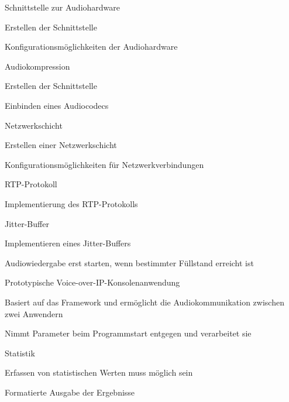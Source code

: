 \begin{compactenum}[a)]
	\item Schnittstelle zur Audiohardware
		\begin{compactenum}[1.]
			\item Erstellen der Schnittstelle
			\item Konfigurationsmöglichkeiten der Audiohardware
		\end{compactenum}
	\item Audiokompression
		\begin{compactenum}[1.]
			\item Erstellen der Schnittstelle
			\item Einbinden eines Audiocodecs
		\end{compactenum}
	\item Netzwerkschicht
		\begin{compactenum}[1.]
			\item Erstellen einer Netzwerkschicht
			\item Konfigurationsmöglichkeiten für Netzwerkverbindungen
		\end{compactenum}
	\item RTP-Protokoll
		\begin{compactenum}[1.]
			\item Implementierung des RTP-Protokolls
		\end{compactenum}
	\item Jitter-Buffer
		\begin{compactenum}[1.]
			\item Implementieren eines Jitter-Buffers
			\item Audiowiedergabe erst starten, wenn bestimmter Füllstand erreicht ist
		\end{compactenum}
	\item Prototypische Voice-over-IP-Konsolenanwendung
		\begin{compactenum}[1.]
			\item Basiert auf das Framework und ermöglicht die Audiokommunikation zwischen zwei Anwendern
			\item Nimmt Parameter beim Programmstart entgegen und verarbeitet sie
		\end{compactenum}
	\item Statistik
		\begin{compactenum}[1.]
			\item Erfassen von statistischen Werten muss möglich sein
			\item Formatierte Ausgabe der Ergebnisse
		\end{compactenum}



\end{compactenum}
